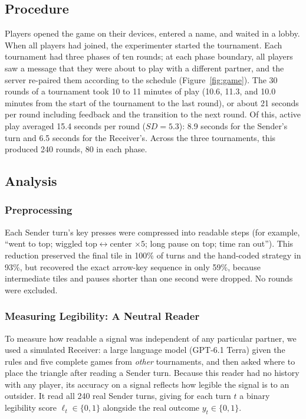 \documentclass[stu,11pt,floatsintext,donotrepeattitle]{apa7}
\begin{document}
\subsection{Procedure}

Players opened the game on their devices, entered a name, and waited in a lobby. When all players had joined, the experimenter started the tournament. Each tournament had three phases of ten rounds; at each phase boundary, all players saw a message that they were about to play with a different partner, and the server re-paired them according to the schedule (Figure~\ref{fig:game}). The 30 rounds of a tournament took 10 to 11 minutes of play (10.6, 11.3, and 10.0 minutes from the start of the tournament to the last round), or about 21 seconds per round including feedback and the transition to the next round. Of this, active play averaged 15.4 seconds per round ($SD = 5.3$): 8.9 seconds for the Sender's turn and 6.5 seconds for the Receiver's. Across the three tournaments, this produced 240 rounds, 80 in each phase.

\subsection{Analysis}

\subsubsection{Preprocessing}

Each Sender turn's key presses were compressed into readable steps (for example, \enquote{went to top; wiggled top$\leftrightarrow$center $\times 5$; long pause on top; time ran out}). This reduction preserved the final tile in 100\% of turns and the hand-coded strategy in 93\%, but recovered the exact arrow-key sequence in only 59\%, because intermediate tiles and pauses shorter than one second were dropped. No rounds were excluded.

\subsubsection{Measuring Legibility: A Neutral Reader}

To measure how readable a signal was independent of any particular partner, we used a simulated Receiver: a large language model (GPT-6.1 Terra) given the rules and five complete games from \emph{other} tournaments, and then asked where to place the triangle after reading a Sender turn. Because this reader had no history with any player, its accuracy on a signal reflects how legible the signal is to an outsider. It read all 240 real Sender turns, giving for each turn $t$ a binary legibility score $\ell_t \in \{0, 1\}$ alongside the real outcome $y_t \in \{0, 1\}$.
\end{document}
